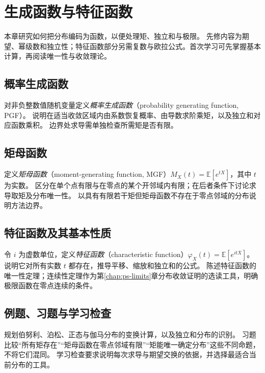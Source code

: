 \setcounter{chapter}{7} %
\chapter{生成函数与特征函数}
\label{chap:ps-generating-functions}

本章研究如何把分布编码为函数，以便处理矩、独立和与极限。
先修内容为期望、幂级数和独立性；特征函数部分另需复数与欧拉公式。首次学习可先掌握基本计算，再阅读唯一性与收敛理论。

\section{概率生成函数}
\label{sec:ps-pgf}
对非负整数值随机变量定义\emph{概率生成函数}（probability generating function, PGF）。
说明在适当收敛区域内由系数恢复概率、由导数求阶乘矩，以及独立和对应函数乘积。
边界处求导需单独检查所需矩是否有限。

\section{矩母函数}
\label{sec:ps-mgf}
定义\emph{矩母函数}（moment-generating function, MGF）$M_X(t)=\mathbb E[e^{tX}]$，其中 $t$ 为实数。
区分在单个点有限与在零点的某个开邻域内有限；在后者条件下讨论求导取矩及分布唯一性。
以具有有限若干矩但矩母函数不存在于零点邻域的分布说明方法边界。

\section{特征函数及其基本性质}
\label{sec:ps-characteristic-function}
令 $i$ 为虚数单位，定义\emph{特征函数}（characteristic function）$\varphi_X(t)=\mathbb E[e^{itX}]$。
说明它对所有实数 $t$ 都存在，推导平移、缩放和独立和的公式。
陈述特征函数的唯一性定理；连续性定理作为第\ref{chap:ps-limits}章分布收敛证明的选读工具，明确极限函数在零点连续的条件。

\section{例题、习题与学习检查}
规划伯努利、泊松、正态与伽马分布的变换计算，以及独立和分布的识别。
习题比较“所有矩存在”“矩母函数在零点邻域有限”“矩能唯一确定分布”这些不同命题，不将它们混同。
学习检查要求说明每次求导与期望交换的依据，并选择最适合当前分布的工具。






